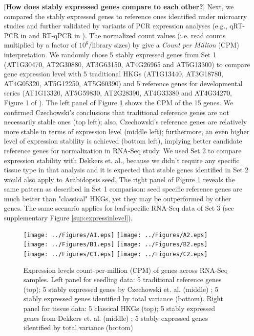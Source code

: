 \documentclass[11pt, a4paper]{article}
\begin{document}
[\textbf{How does stably expressed genes compare to each other?}]
Next, we compared the stably expressed genes to reference ones identified under microarry studies and further validated by variants of PCR expression analyses (e.g., qRT-PCR in \cite{czechowski2005genome} and RT-qPCR in \cite{dekkers2012identification}). The normalized count values  (i.e. read counts multiplied by a factor of  $10^6$/library sizes) by \cite{anders2013count} give a \textit{Count per Million} (CPM) interpretation.  We randomly chose 5 stably expressed genes from Set 1 (AT1G30470, AT2G30880, AT3G63150, AT4G26965 and AT5G13300) to compare gene expression level with 5 traditional HKGs  (AT1G13440, AT3G18780, AT4G05320, AT5G12250, AT5G60390) and 5  reference genes  for developmental series (AT1G13320, AT5G59830, AT2G28390, AT4G33380 and AT4G34270, Figure 1 of \cite{czechowski2005genome}). The left panel of  Figure \ref{expressinlevel} shows the CPM of the 15 genes. We confirmed Czechowski's conclusions that traditional reference genes are not necessarily stable ones (top left); also, Czechowski's reference genes are relatively more stable in terms of expression level (middle left); furthermore, an even higher level of expression stability is achieved (bottom left), implying better candidate reference genes for normalization in RNA-Seq study. We used Set 2 to compare expression stability with Dekkers et. al., because we didn't require any specific tissue type in that analysis and  it is expected that stable genes identified in Set 2 would also apply to Arabidopsis seed. The right panel of Figure \ref{expressinlevel} reveals the same pattern as described in Set 1 comparison: seed specific reference genes are much better than "classical" HKGs, yet they may be outperformed by other genes.  The same scenario applies for leaf-specific RNA-Seq data of Set 3 (see supplementary Figure \ref{sup:expressinlevel}).  %

 \begin{figure}[H]
\begin{center}
\texttt{[image: ../Figures/A1.eps]}
\texttt{[image: ../Figures/A2.eps]}
\texttt{[image: ../Figures/B1.eps]}
\texttt{[image: ../Figures/B2.eps]}
\texttt{[image: ../Figures/C1.eps]}
\texttt{[image: ../Figures/C2.eps]}

\caption{{\small{\label{expressinlevel} Expression levels  count-per-million (CPM) of genes across RNA-Seq samples. Left panel for seedling data:  5 traditional reference genes (top)};  5 stably expressed genes by Czechowski et. al. (middle) ; 5 stably expressed genes identified by total variance (bottom). Right panel for tissue data: 5 classical HKGs (top);  5 stably expressed genes from Dekkers et. al. (middle) ; 5 stably expressed genes identified by total variance (bottom) }}
\end{center}
\end{figure} 
\end{document}
